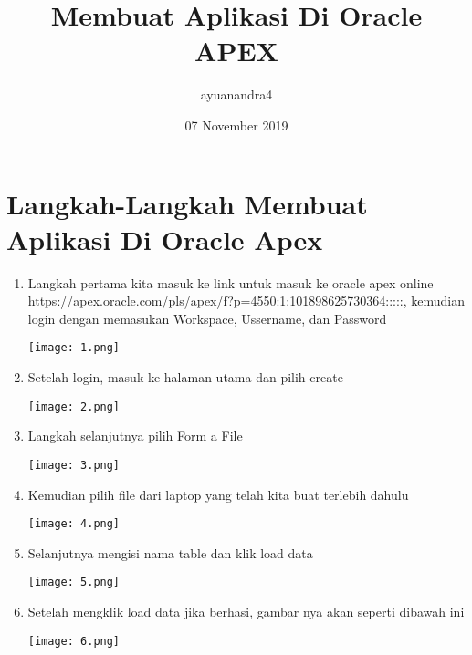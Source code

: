 \documentclass{article}
\title{Membuat Aplikasi Di Oracle APEX}
\author{ayuanandra4 }
\date{07 November 2019}
\begin{document}
\maketitle

\section{Langkah-Langkah Membuat Aplikasi Di Oracle Apex}

\begin{enumerate}
    \item {Langkah pertama kita masuk ke link untuk masuk ke oracle apex online https://apex.oracle.com/pls/apex/f?p=4550:1:101898625730364:::::, kemudian login dengan memasukan Workspace, Ussername, dan Password}
  \begin{center}
        \texttt{[image: 1.png]}
    \end{center}
    
    \item {Setelah login, masuk ke halaman utama dan pilih create}
    \begin{center}
        \texttt{[image: 2.png]}
    \end{center}
    
    \item {Langkah selanjutnya pilih Form a File}
    \begin{center}
        \texttt{[image: 3.png]}
    \end{center}

    \item {Kemudian pilih file dari laptop yang telah kita buat terlebih dahulu}
    \begin{center}
        \texttt{[image: 4.png]}
    \end{center}
    
    \item {Selanjutnya mengisi nama table dan klik load data}
    \begin{center}
        \texttt{[image: 5.png]}
    \end{center}
    
    \item {Setelah mengklik load data jika berhasi, gambar nya akan seperti dibawah ini}
    \begin{center}
        \texttt{[image: 6.png]}
    \end{center}


\end{enumerate}
\end{document}
